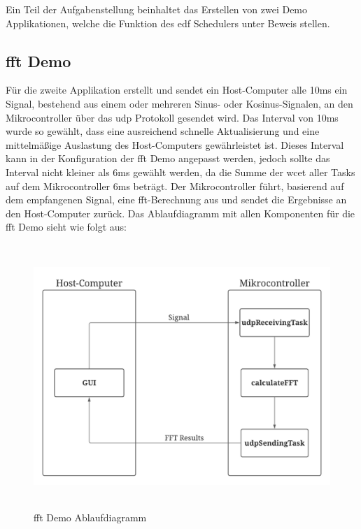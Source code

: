 \documentclass[../EDF Master Thesis.tex]{subfiles}
\begin{document}
    Ein Teil der Aufgabenstellung beinhaltet das Erstellen von zwei Demo Applikationen, welche die Funktion des \ac{edf} Schedulers unter Beweis stellen.

    \subsection{\ac{fft} Demo} \label{section:fft_demo}

        Für die zweite Applikation erstellt und sendet ein Host-Computer alle 10ms ein Signal, bestehend aus einem oder mehreren Sinus- oder Kosinus-Signalen, an den Mikrocontroller über das \ac{udp} Protokoll gesendet wird.
        Das Interval von 10ms wurde so gewählt, dass eine ausreichend schnelle Aktualisierung und eine mittelmäßige Auslastung des Host-Computers gewährleistet ist.
        Dieses Interval kann in der Konfiguration der \ac{fft} Demo angepasst werden, jedoch sollte das Interval nicht kleiner als 6ms gewählt werden, da die Summe der \ac{wcet} aller Tasks auf dem Mikrocontroller 6ms beträgt.
        Der Mikrocontroller führt, basierend auf dem empfangenen Signal, eine \ac{fft}-Berechnung aus und sendet die Ergebnisse an den Host-Computer zurück.
        Das Ablaufdiagramm mit allen Komponenten für die \ac{fft} Demo sieht wie folgt aus:

        \begin{figure}[H]
            \centering
            \includegraphics[height=10cm, width=14cm]{./attachments/FFT Ablauf.pdf}
            \caption{\ac{fft} Demo Ablaufdiagramm}
            \label{fig:fft_demo_ablaufdiagramm}
        \end{figure}
\end{document}
